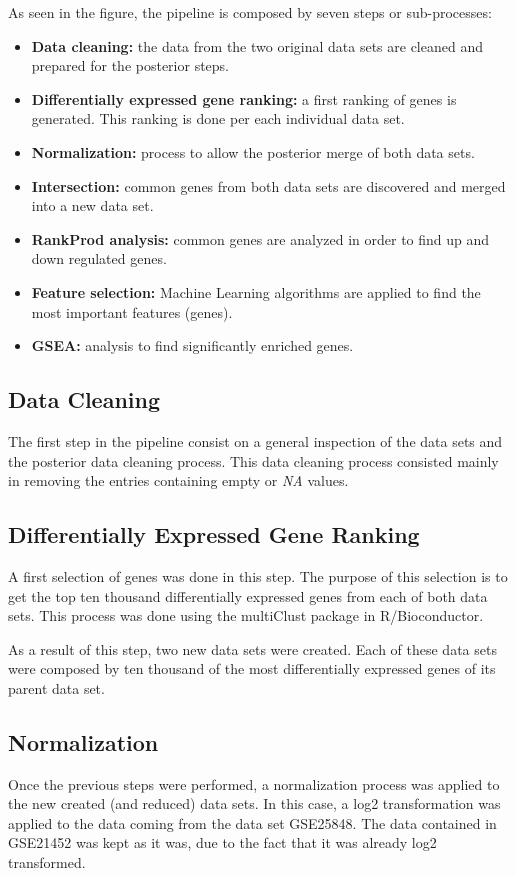 As seen in the figure, the pipeline is composed by seven steps or sub-processes:

\begin{itemize}
    \item \textbf{Data cleaning:} the data from the two original data sets are cleaned and prepared for the posterior steps.
    \item \textbf{Differentially expressed gene ranking:} a first ranking of genes is generated. This ranking is done per each individual data set.
    \item \textbf{Normalization:} process to allow the posterior merge of both data sets.
    \item \textbf{Intersection:} common genes from both data sets are discovered and merged into a new data set.
    \item \textbf{RankProd analysis:} common genes are analyzed in order to find up and down regulated genes.
    \item \textbf{Feature selection:} Machine Learning algorithms are applied to find the most important features (genes).
    \item \textbf{GSEA:} analysis to find significantly enriched genes.
\end{itemize}

\subsection{Data Cleaning}
The first step in the pipeline consist on a general inspection of the data sets and the posterior data cleaning process. This data cleaning process consisted mainly in removing the entries containing empty or \textit{NA} values.

\subsection{Differentially Expressed Gene Ranking}

A first selection of genes was done in this step. The purpose of this selection is to get the top ten thousand differentially expressed genes from each of both data sets.
This process was done using the multiClust\cite{multiClust} package in R/Bioconductor.

As a result of this step, two new data sets were created. Each of these data sets were composed by ten thousand of the most differentially expressed genes of its parent data set. 

\subsection{Normalization}
Once the previous steps were performed, a normalization process was applied to the new created (and reduced) data sets. In this case, a log2 transformation was applied to the data coming from the data set GSE25848. The data contained in GSE21452 was kept as it was, due to the fact that it was already log2 transformed.

